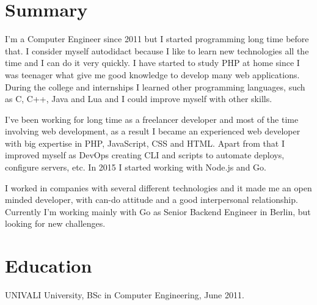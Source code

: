\documentclass[margin]{res}
\begin{document}
\address{Berlin, DE \\ xguiga@gmail.com \\ Phone: +49 (173) 979-9383 }

\begin{resume}

\section{Summary}
I'm a Computer Engineer since 2011 but I started programming long time before that. I consider myself autodidact because I like to learn new technologies all the time and I can do it very quickly. I have started to study PHP at home since I was teenager what give me good knowledge to develop many web applications. During the college and internships I learned other programming languages, such as C, C++, Java and Lua and I could improve myself with other skills.

I've been working for long time as a freelancer developer and most of the time involving web development, as a result I became an experienced web developer with big expertise in PHP, JavaScript, CSS and HTML. Apart from that I improved myself as DevOps creating CLI and scripts to automate deploys, configure servers, etc. In 2015 I started working with Node.js and Go.

I worked in companies with several different technologies and it made me an open minded developer, with can-do attitude and a good interpersonal relationship. Currently I'm working mainly with Go as Senior Backend Engineer in Berlin, but looking for new challenges.

\section{Education} UNIVALI University, BSc in Computer Engineering, June 2011.


\end{resume}
\end{document}
